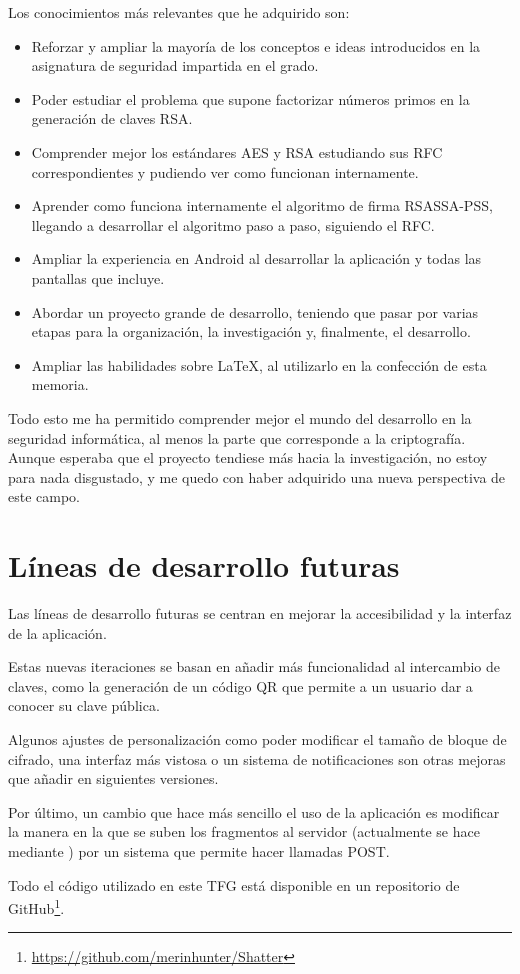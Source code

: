 Los conocimientos más relevantes que he adquirido son:

\begin{itemize}
  \item Reforzar y ampliar la mayoría de los conceptos e ideas introducidos en la asignatura de seguridad impartida en el grado.
  \item Poder estudiar el problema que supone factorizar números primos en la generación de claves RSA.
  \item Comprender mejor los estándares AES y RSA estudiando sus RFC correspondientes y pudiendo ver como funcionan internamente.
  \item Aprender como funciona internamente el algoritmo de firma RSASSA-PSS, llegando a desarrollar el algoritmo paso a paso, siguiendo el RFC.
  \item Ampliar la experiencia en Android al desarrollar la aplicación y todas las pantallas que incluye.
  \item Abordar un proyecto grande de desarrollo, teniendo que pasar por varias etapas para la organización, la investigación y, finalmente, el desarrollo.
  \item Ampliar las habilidades sobre \LaTeX, al utilizarlo en la confección de esta memoria.
\end{itemize}

Todo esto me ha permitido comprender mejor el mundo del desarrollo en la seguridad informática, al menos la parte que corresponde a la criptografía. Aunque esperaba que el proyecto tendiese más hacia la investigación, no estoy para nada disgustado, y me quedo con haber adquirido una nueva perspectiva de este campo.

\section{Líneas de desarrollo futuras}

Las líneas de desarrollo futuras se centran en mejorar la accesibilidad y la interfaz de la aplicación.

Estas nuevas iteraciones se basan en añadir más funcionalidad al intercambio de claves, como la generación de un código QR que permite a un usuario dar a conocer su clave pública.

Algunos ajustes de personalización como poder modificar el tamaño de bloque de cifrado, una interfaz más vistosa o un sistema de notificaciones son otras mejoras que añadir en siguientes versiones.

Por último, un cambio que hace más sencillo el uso de la aplicación es modificar la manera en la que se suben los fragmentos al servidor (actualmente se hace mediante ) por un sistema que permite hacer llamadas POST.

Todo el código utilizado en este TFG está disponible en un repositorio de GitHub\footnote{\url{https://github.com/merinhunter/Shatter}}.
